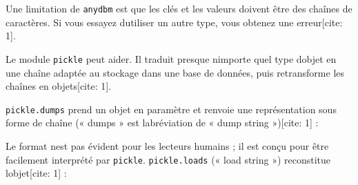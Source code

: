 Une limitation de \texttt{anydbm} est que les clés et les valeurs
doivent être des chaînes de caractères. Si vous essayez
d\textquotesingle utiliser un autre type, vous obtenez une
erreur{[}cite: 1{]}.

Le module \texttt{pickle} peut aider. Il traduit presque
n\textquotesingle importe quel type d\textquotesingle objet en une
chaîne adaptée au stockage dans une base de données, puis retransforme
les chaînes en objets{[}cite: 1{]}.

\texttt{pickle.dumps} prend un objet en paramètre et renvoie une
représentation sous forme de chaîne (« dumps » est
l\textquotesingle abréviation de « dump string »){[}cite: 1{]} :

\begin{Shaded}
\begin{Highlighting}[]
\OperatorTok{\textgreater{}\textgreater{}\textgreater{}} 
\OperatorTok{\textgreater{}\textgreater{}\textgreater{}}\OperatorTok{=}\NormalTok{ [}\NormalTok{, }\NormalTok{, }\NormalTok{]}
\OperatorTok{\textgreater{}\textgreater{}\textgreater{}}
\end{Highlighting}
\end{Shaded}

Le format n\textquotesingle est pas évident pour les lecteurs humains ;
il est conçu pour être facilement interprété par \texttt{pickle}.
\texttt{pickle.loads} (« load string ») reconstitue
l\textquotesingle objet{[}cite: 1{]} :

\begin{Shaded}
\begin{Highlighting}[]
\OperatorTok{\textgreater{}\textgreater{}\textgreater{}}\OperatorTok{=}\NormalTok{ [}\NormalTok{, }\NormalTok{, }\NormalTok{]}
\OperatorTok{\textgreater{}\textgreater{}\textgreater{}}\OperatorTok{=}
\OperatorTok{\textgreater{}\textgreater{}\textgreater{}}\OperatorTok{=}
\OperatorTok{\textgreater{}\textgreater{}\textgreater{}} 
\NormalTok{[}\NormalTok{, }\NormalTok{, }\NormalTok{]}
\end{Highlighting}
\end{Shaded}

